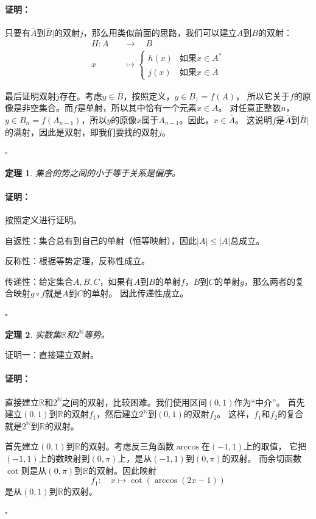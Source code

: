\documentclass[12pt,UTF8]{ctexbook}
\renewenvironment{proof}{\paragraph{\textbf{证明：}}}{\hfill$\square$}
\newtheorem{tm}{定理}[section]
\begin{document}
\begin{appendix}
\begin{proof}
    只要有$\overline{A}$到$\overline{B}|$的双射$j$，那么用类似前面的思路，我们可以建立$A$到$B$的双射：
    \begin{align*}
        H : A \quad&\rightarrow \quad B  \\
        x \quad&\mapsto \left\{ \begin{array}{ll}
            h(x) & \mbox{如果} x\in A^*  \\
            j(x) & \mbox{如果} x\in \overline{A}
        \end{array} \right.
    \end{align*}

    最后证明双射$j$存在。考虑$y \in \overline{B}$，按照定义，$y\in B_1 = f(A)$，
    所以它关于$f$的原像是非空集合。而$f$是单射，所以其中恰有一个元素$x\in A$。
    对任意正整数$n$，$y\in B_n = f(A_{n-1})$，所以$y$的原像$x$属于$A_{n-1}$。因此，$x\in \overline{A}$。
    这说明$f$是$\overline{A}$到$\overline{B}|$的满射，因此是双射，即我们要找的双射$j$。

\end{proof}

\begin{tm}
    集合的势之间的小于等于关系是偏序。
\end{tm}

\begin{proof}
    按照定义进行证明。
    
    自返性：集合总有到自己的单射（恒等映射），因此$|A| \leqslant |A|$总成立。

    反称性：根据等势定理，反称性成立。

    传递性：给定集合$A,B,C$，如果有$A$到$B$的单射$f$，$B$到$C$的单射$g$，那么两者的复合映射$g\circ f$就是$A$到$C$的单射。
    因此传递性成立。

\end{proof}

\begin{tm}
    实数集$\mathbb{R}$和$2^\mathbb{N}$等势。
\end{tm}

证明一：直接建立双射。

\begin{proof}
    直接建立$\mathbb{R}$和$2^\mathbb{N}$之间的双射，比较困难。我们使用区间$(0,1)$作为“中介”。
    首先建立$(0,1)$到$\mathbb{R}$的双射$f_1$，然后建立$2^\mathbb{N}$到$(0,1)$的双射$f_2$。
    这样，$f_1$和$f_2$的复合就是$2^\mathbb{N}$到$\mathbb{R}$的双射。
    
    首先建立$(0,1)$到$\mathbb{R}$的双射。考虑反三角函数$\arccos$在$(-1,1)$上的取值，
    它把$(-1,1)$上的数映射到$(0,\pi)$上，是从$(-1,1)$到$(0,\pi)$的双射。
    而余切函数$\cot$则是从$(0,\pi)$到$\mathbb{R}$的双射。因此映射
    $$ f_1 :\quad x \mapsto \cot{\left(\arccos{(2x-1)}\right)} $$
    是从$(0,1)$到$\mathbb{R}$的双射。


\end{proof}
\end{appendix}
\end{document}
